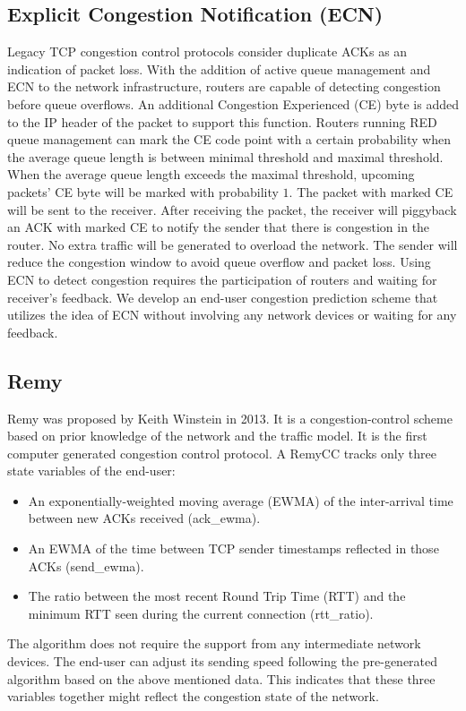 \subsection{Explicit Congestion Notification (ECN)}
\par Legacy TCP congestion control protocols consider duplicate ACKs as an indication of packet loss. With the addition of active queue management and ECN \cite{ramakrishnan2001rfc} to the network infrastructure, routers are capable of detecting congestion before queue overflows. An additional Congestion Experienced (CE) byte is added to the IP header of the packet to support this function. Routers running RED queue management can mark the CE code point with a certain probability when the average queue length is between minimal threshold and maximal threshold. When the average queue length exceeds the maximal threshold, upcoming packets' CE byte will be marked with probability $1$. The packet with marked CE will be sent to the receiver. After receiving the packet, the receiver will piggyback an ACK with marked CE to notify the sender that there is congestion in the router. No extra traffic will be generated to overload the network. The sender will reduce the congestion window to avoid queue overflow and packet loss. Using ECN to detect congestion requires the participation of routers and waiting for receiver's feedback. We develop an end-user congestion prediction scheme that utilizes the idea of ECN without involving any network devices or waiting for any feedback.
\subsection{Remy}
\par Remy \cite{winstein2013tcp} was proposed by Keith Winstein in 2013. It is a congestion-control scheme based on prior knowledge of the network and the traffic model. It is the first computer generated congestion control protocol. A RemyCC tracks only three state variables of the end-user:
\begin{itemize}
\item An exponentially-weighted moving average (EWMA) of the inter-arrival time between new ACKs received (ack\_ewma).
\item An EWMA of the time between TCP sender timestamps reflected in those ACKs (send\_ewma).
\item The ratio between the most recent Round Trip Time (RTT) and the minimum RTT seen during the current connection (rtt\_ratio).
\end{itemize}
The algorithm does not require the support from any intermediate network devices. The end-user can adjust its sending speed following the pre-generated algorithm based on the above mentioned data. This indicates that these three variables together might reflect the congestion state of the network. 


